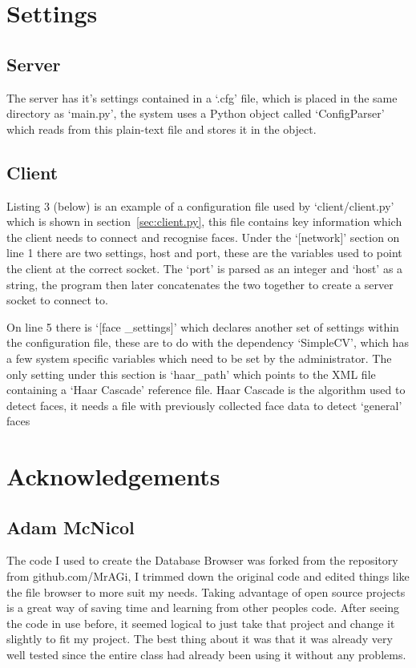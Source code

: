 \documentclass[a4paper]{article}
\begin{document}
\section{Settings}
    \label{sec:settings}
    \subsection{Server}
    The server has it's settings contained in a `.cfg' file, which is placed in the same directory as `main.py',
    the system uses a Python object called `ConfigParser' which reads from this plain-text file and stores it in
    the object.
    

    \subsection{Client}
    Listing 3 (below) is an example of a configuration file used by `client/client.py' which is shown in section~\ref{sec:client.py},
    this file contains key information which the client needs to connect and recognise faces. Under the `[network]' section
    on line 1 there are two settings, host and port, these are the variables used to point the client at the correct socket.
    The `port' is parsed as an integer and `host' as a string, the program then later concatenates the two together to create
    a server socket to connect to.

    On line 5 there is `[face \_settings]' which declares another set of settings within the configuration file, these are to do with
    the dependency `SimpleCV', which has a few system specific variables which need to be set by the administrator. The only setting
    under this section is `haar\_path' which points to the XML file containing a `Haar Cascade' reference file. Haar Cascade is the
    algorithm used to detect faces, it needs a file with previously collected face data to detect `general' faces
    
\section{Acknowledgements}
    \subsection{Adam McNicol}
    The code I used to create the Database Browser was forked from the repository from github.com/MrAGi, I trimmed
    down the original code and edited things like the file browser to more suit my needs. Taking advantage of
    open source projects is a great way of saving time and learning from other peoples code. After seeing the code
    in use before, it seemed logical to just take that project and change it slightly to fit my project. The best
    thing about it was that it was already very well tested since the entire class had already been using it without
    any problems.
\end{document}
